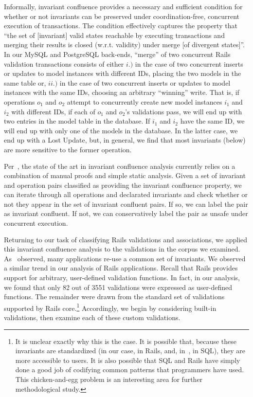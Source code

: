 Informally, invariant confluence provides a necessary and sufficient
condition for whether or not invariants can be preserved under
coordination-free, concurrent execution of transactions. The condition
effectively captures the property that ``the set of [invariant] valid
states reachable by executing transactions and merging their results
is closed (w.r.t. validity) under merge [of divergent states]''. In
our MySQL and PostgreSQL back-ends, ``merge'' of two concurrent Rails
validation transactions consists of either $i.)$ in the case of two
concurrent inserts or updates to model instances with different IDs,
placing the two models in the same table or, $ii.)$ in the case of two
concurrent inserts or updates to model instances with the same IDs,
choosing an arbitrary ``winning'' write. That is, if operations $o_1$
and $o_2$ attempt to concurrently create new model instances $i_1$ and
$i_2$ with different IDs, if each of $o_1$ and $o_2$'s validations
pass, we will end up with two entries in the model table in the
database. If $i_1$ and $i_2$ have the same ID, we will end up with
only one of the models in the database. In the latter case, we end up
with a Lost Update, but, in general, we find that most invariants
(below) are more sensitive to the former operation.

Per~\cite{coord-avoid}, the state of the art in invariant confluence
analysis currently relies on a combination of manual proofs and simple
static analysis. Given a set of invariant and operation pairs
classified as providing the invariant confluence property, we can
iterate through all operations and declarated invariants and check
whether or not they appear in the set of invariant confluent pairs. If
so, we can label the pair as invariant confluent. If not, we can
conservatively label the pair as unsafe under concurrent execution.

Returning to our task of classifying Rails validations and
associations, we applied this invariant confluence analysis to the
validations in the corpus we examined. As~\cite{coord-avoid} observed,
many applications re-use a common set of invariants. We observed a
similar trend in our analysis of Rails applications. Recall that Rails
provides support for arbitrary, user-defined validation functions. In
fact, in our analysis, we found that only 82 out of 3551 validations
were expressed as user-defined functions. The remainder were drawn
from the standard set of validations supported by Rails core.\footnote{It is
  unclear exactly why this is the case. It is possible that, because
  these invariants are standardized (in our case, in Rails, and,
  in~\cite{coord-avoid}, in SQL), they are more accessible to
  users. It is also possible that SQL and Rails have simply done a
  good job of codifying common patterns that programmers have
  used. This chicken-and-egg problem is an interesting area for
  further methodological study.} Accordingly, we begin by considering
built-in validations, then examine each of these custom validations.


